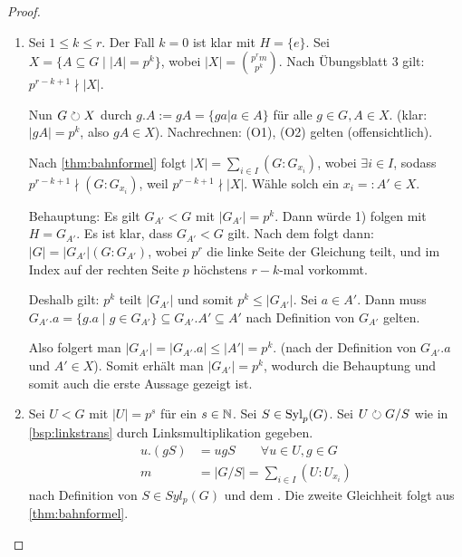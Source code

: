 \documentclass[12pt,a4paper]{scrartcl}
\begin{document}
\begin{proof}
	\leavevmode
	\begin{enumerate}
		\item Sei $1\leq k \leq r$. Der Fall $k = 0$ ist klar mit $H = \{e\}$. Sei $X = \{A\subseteq G \mid |A| = p^k\}$, wobei $|X| = \binom{p^rm}{p^k}$. Nach Übungsblatt 3 gilt: $p^{r-k+1}\nmid |X|$.
		
		Nun $G \circlearrowright X$ durch $g.A := gA=\{ga|a\in A\}$ für alle $g\in G, A\in X$. (klar: $|gA| = p^k $, also $gA\in X$). Nachrechnen: (O1), (O2) gelten (offensichtlich). 
		
		Nach \cref{thm:bahnformel} folgt $|X| = \sum_{i\in I}(G:G_{x_i})$, wobei $\exists i\in I$, sodass $p^{r-k+1} \nmid (G:G_{x_i})$, weil $p^{r-k+1}\nmid |X|$. Wähle solch ein $x_i = : A'\in X$.
		
		Behauptung: Es gilt $G_{A'}<G$ mit $|G_{A'}| = p^k$. Dann würde 1) folgen mit $H = G_{A'}$. Es ist klar, dass $G_{A'}<G$ gilt. Nach dem  folgt dann: $|G| = |G_{A'}|(G:G_{A'})$, wobei $p^r$ die linke Seite der Gleichung teilt, und im Index auf der rechten Seite $p$ höchstens $r-k$-mal vorkommt.
		
		Deshalb gilt: $p^k$ teilt $|G_{A'}|$ und somit $p^k\leq |G_{A'}|$. Sei $a\in A'$. Dann muss $G_{A'}.a = \{g.a\mid g\in G_{A'}\}\subseteq G_{A'}.A'\subseteq A'$ nach Definition von $G_{A'}$ gelten.
		
		Also folgert man $|G_{A'}| = |G_{A'}.a|\leq |A'| = p^k$.  (nach der Definition von $G_{A'}.a$ und $A'\in X$).
		Somit erhält man $|G_{A'}| = p^k$, wodurch die Behauptung und somit auch die erste Aussage gezeigt ist.
		
		\item Sei $U<G$ mit $|U| = p^s$ für ein $s\in\mathbb N$. Sei $S\in \operatorname{Syl}_p(G)$. Sei $U \circlearrowright G/S$ wie in \cref{bsp:linkstrans} durch Linksmultiplikation gegeben.
		\begin{align*}
			u.(gS) &= ugS\qquad \forall u\in U, g\in G \\
			m &= |G/S| = \sum_{i\in I}(U:U_{x_i})
		\end{align*}
		nach Definition von $S\in Syl_p(G)$ und dem . Die zweite Gleichheit folgt aus \cref{thm:bahnformel}.
		

\end{enumerate}
\end{proof}
\end{document}
